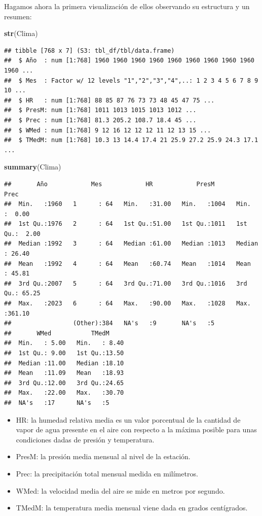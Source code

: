 \documentclass[12pt,a4paper,]{book}
\newenvironment{Shaded}{\begin{snugshade}}{\end{snugshade}}
\newcommand{\FunctionTok}[1]{\textcolor[rgb]{0.13,0.29,0.53}{\textbf{#1}}}
\newcommand{\NormalTok}[1]{#1}
\numberwithin{dummy}{section}
\theoremstyle{ocrenumbox}
\theoremstyle{blacknumex}
\theoremstyle{blacknumbox}
\theoremstyle{ocrenum}
\theoremstyle{ocrenum}
\begin{document}
Hagamos ahora la primera visualización de ellos observando su estructura
y un resumen:

\begin{Shaded}
\begin{Highlighting}[]
\FunctionTok{str}\NormalTok{(Clima)}
\end{Highlighting}
\end{Shaded}

\begin{verbatim}
## tibble [768 x 7] (S3: tbl_df/tbl/data.frame)
##  $ Año  : num [1:768] 1960 1960 1960 1960 1960 1960 1960 1960 1960 1960 ...
##  $ Mes  : Factor w/ 12 levels "1","2","3","4",..: 1 2 3 4 5 6 7 8 9 10 ...
##  $ HR   : num [1:768] 88 85 87 76 73 73 48 45 47 75 ...
##  $ PresM: num [1:768] 1011 1013 1015 1013 1012 ...
##  $ Prec : num [1:768] 81.3 205.2 108.7 18.4 45 ...
##  $ WMed : num [1:768] 9 12 16 12 12 12 11 12 13 15 ...
##  $ TMedM: num [1:768] 10.3 13 14.4 17.4 21 25.9 27.2 25.9 24.3 17.1 ...
\end{verbatim}

\begin{Shaded}
\begin{Highlighting}[]
\FunctionTok{summary}\NormalTok{(Clima)}
\end{Highlighting}
\end{Shaded}

\begin{verbatim}
##       Año            Mes            HR            PresM           Prec       
##  Min.   :1960   1      : 64   Min.   :31.00   Min.   :1004   Min.   :  0.00  
##  1st Qu.:1976   2      : 64   1st Qu.:51.00   1st Qu.:1011   1st Qu.:  2.00  
##  Median :1992   3      : 64   Median :61.00   Median :1013   Median : 26.40  
##  Mean   :1992   4      : 64   Mean   :60.74   Mean   :1014   Mean   : 45.81  
##  3rd Qu.:2007   5      : 64   3rd Qu.:71.00   3rd Qu.:1016   3rd Qu.: 65.25  
##  Max.   :2023   6      : 64   Max.   :90.00   Max.   :1028   Max.   :361.10  
##                 (Other):384   NA's   :9       NA's   :5                      
##       WMed           TMedM      
##  Min.   : 5.00   Min.   : 8.40  
##  1st Qu.: 9.00   1st Qu.:13.50  
##  Median :11.00   Median :18.10  
##  Mean   :11.09   Mean   :18.93  
##  3rd Qu.:12.00   3rd Qu.:24.65  
##  Max.   :22.00   Max.   :30.70  
##  NA's   :17      NA's   :5
\end{verbatim}

\begin{itemize}
  \item HR: la humedad relativa media es un valor porcentual de la cantidad de vapor de agua presente en el aire con respecto a la máxima posible para unas condiciones dadas de presión y temperatura.
  \item PresM: la presión media mensual al nivel de la estación.
  \item Prec: la precipitación total mensual medida en milímetros.
  \item WMed: la velocidad media del aire se mide en metros por segundo. 
  \item TMedM: la temperatura media mensual viene dada en grados centígrados. 
\end{itemize}
\end{document}
